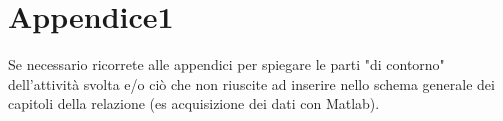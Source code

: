 \documentclass[11pt]{report}
\begin{document}



\appendix
\chapter{Appendice1}
Se necessario ricorrete alle appendici per spiegare le parti "di contorno" dell'attività svolta e/o ciò che non riuscite ad inserire nello schema generale dei capitoli della relazione (es acquisizione dei dati con Matlab).



 
\end{document}
